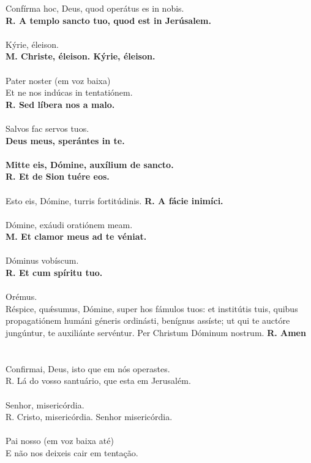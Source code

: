 \newpage
\begin{multicols}{2}
\noindent Confírma hoc, Deus, quod operátus es in nobis.
\\ \textbf{R. A templo sancto tuo, quod est in Jerúsalem.}
\\
\\Kýrie, éleison.
\\ \textbf{M. Christe, éleison. Kýrie, éleison.}
\\
\\Pater noster (em voz baixa)
\\Et ne nos indúcas in
tentatiónem.
\\ \textbf{R. Sed líbera nos a malo.}
\\
\\ Salvos fac servos tuos.
\\ \textbf{Deus meus, sperántes in te.}
\\
\\ \textbf{Mitte eis, Dómine, auxílium de sancto.}
\\ \textbf{R. Et de Sion tuére eos.}
\\
\\ Esto eis, Dómine, turris fortitúdinis.
\textbf{R. A fácie inimíci.}
\\
\\Dómine, exáudi oratiónem meam.
\\ \textbf{M. Et clamor meus ad te véniat.}
\\
\\Dóminus vobíscum.
\\ \textbf{R. Et cum spíritu tuo.}
\\
\\Orémus.
\\Réspice, quǽsumus, Dómine, super hos fámulos tuos: et institútis tuis, quibus propagatiónem humáni géneris ordinásti, benígnus assíste; ut qui te auctóre jungúntur, te auxiliánte servéntur. Per Christum Dóminum nostrum. \textbf{R. Amen}
\\
\\
\\Confirmai, Deus, isto que em nós operastes.
\\R. Lá do vosso santuário, que esta em Jerusalém.
\\
\\Senhor, misericórdia.
\\R. Cristo, misericórdia. Senhor misericórdia.
\\
\\Pai nosso (em voz baixa até) 
\\E não nos deixeis cair em tentação.

\end{multicols}
